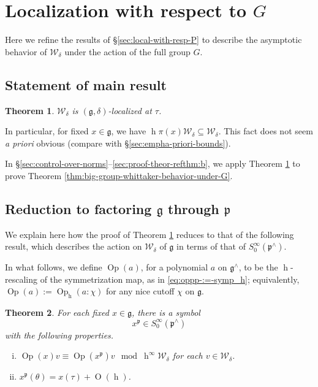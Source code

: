 \documentclass[reqno]{amsart}
\DeclareMathOperator{\h}{h}
\def\O{\operatorname{O}}
\DeclareMathOperator{\Opp}{Op}
\theoremstyle{plain} \newtheorem{theorem} {Theorem}
\theoremstyle{definition} \newtheorem{definition} [theorem] {Definition}
\theoremstyle{itplain} %
\numberwithin{equation}{section}
\numberwithin{theorem}{section}
\begin{document}
\section{Localization with respect to $G$}\label{sec:local-with-resp}

Here we refine the results of \S\ref{sec:local-with-resp-P} to describe the asymptotic behavior of $\mathcal{W}_\delta$ under the action of the full group $G$.


\subsection{Statement of main result}
\begin{theorem}\label{thm:cal-W-delta-g-acts-localized}
  $\mathcal{W}_{\delta}$ is
  $(\mathfrak{g},\delta)$-localized at $\tau$.
\end{theorem}
In particular, for fixed $x \in \mathfrak{g}$, we have $\h \pi(x) \mathcal{W}_\delta \subseteq \mathcal{W}_\delta$.  This fact does not seem \emph{a priori} obvious (compare with \S\ref{sec:empha-priori-bounds}).

In \S\ref{sec:control-over-norms}--\ref{sec:proof-theor-refthm:b}, we apply Theorem \ref{thm:cal-W-delta-g-acts-localized} to prove Theorem \ref{thm:big-group-whittaker-behavior-under-G}. 

\subsection{Reduction
  to factoring $\mathfrak{g}$ through $\mathfrak{p}$}
We explain here how the proof of Theorem \ref{thm:cal-W-delta-g-acts-localized} reduces to that of the following result, which describes the action on $\mathcal{W}_\delta$ of $\mathfrak{g}$ in terms of that of $S^\infty_0(\mathfrak{p}^\wedge)$.

In what follows, we define $\Opp(a)$, for a polynomial $a$ on $\mathfrak{g}^\wedge$, to be the $\h$-rescaling of the symmetrization map, as in \eqref{eq:oppp-:=-symp_h}; equivalently, $\Opp(a) := \Opp_{\h}(a:\chi)$ for any nice cutoff $\chi$ on $\mathfrak{g}$.

\begin{theorem}\label{thm:g-via-p}
  For each fixed $x \in \mathfrak{g}$, there is a symbol
  \[x^{\mathfrak{p}} \in S_0^\infty(\mathfrak{p}^\wedge)\] with the following properties.
  \begin{enumerate}[(i)]
  \item $\Opp(x) v \equiv \Opp(x^\mathfrak{p}) v \mod{\h^\infty \mathcal{W}_\delta}$ for each $v \in \mathcal{W}_\delta$.
  \item $x^\mathfrak{p}(\theta) = x(\tau) + \O(\h)$.
  \end{enumerate}
\end{theorem}
\end{document}
